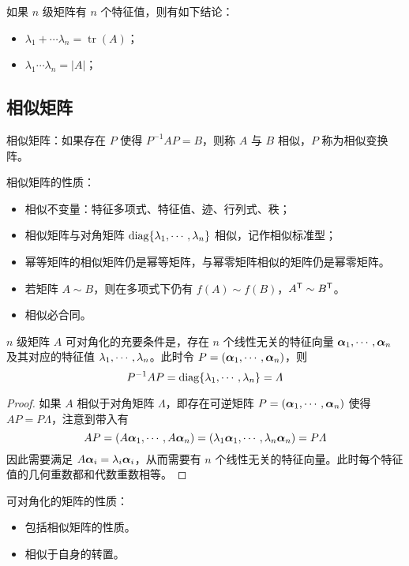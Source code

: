 如果 $n$ 级矩阵有 $n$ 个特征值，则有如下结论：
\begin{itemize}
	\item $\lambda_1 + \cdots \lambda_n = \operatorname{tr}(A)$；
	\item $\lambda_1 \cdots \lambda_n = |A|$；
\end{itemize}

\subsection{相似矩阵}

相似矩阵：如果存在 $P$ 使得 $P^{-1} A P = B$，则称 $A$ 与 $B$ 相似，$P$ 称为相似变换阵。

相似矩阵的性质：
\begin{itemize}
	\item 相似不变量：特征多项式、特征值、迹、行列式、秩；
	\item 相似矩阵与对角矩阵 $\operatorname{diag}\{\lambda_1,\cdots,\lambda_n\}$ 相似，记作相似标准型；
	\item 幂等矩阵的相似矩阵仍是幂等矩阵，与幂零矩阵相似的矩阵仍是幂零矩阵。
	\item 若矩阵 $A \sim B$，则在多项式下仍有 $f(A) \sim f(B)$，${A}^\mathsf{T} \sim {B}^\mathsf{T}$。
	\item 相似必合同。
\end{itemize}

\begin{theorem}[可对角化的充要条件]
	$n$ 级矩阵 $A$ 可对角化的充要条件是，存在 $n$ 个线性无关的特征向量 $\boldsymbol{\alpha}_1,\cdots,\boldsymbol{\alpha}_n$ 及其对应的特征值 $\lambda_1,\cdots,\lambda_n$。此时令 $P = (\boldsymbol{\alpha}_1,\cdots,\boldsymbol{\alpha}_n)$，则
	\[ P^{-1}AP = \operatorname{diag} \{\lambda_1,\cdots,\lambda_n\} = \varLambda \]
\end{theorem}

\begin{proof}
	如果 $A$ 相似于对角矩阵 $\varLambda$，即存在可逆矩阵 $P = (\boldsymbol{\alpha}_1,\cdots,\boldsymbol{\alpha}_n)$ 使得 $AP = P\varLambda$，注意到带入有
	\[ AP = (A\boldsymbol{\alpha}_1,\cdots,A\boldsymbol{\alpha}_n) = (\lambda_1 \boldsymbol{\alpha}_1, \cdots, \lambda_n \boldsymbol{\alpha}_n) = P\varLambda \]
	因此需要满足 $A \boldsymbol{\alpha}_i = \lambda_i \boldsymbol{\alpha}_i$，从而需要有 $n$ 个线性无关的特征向量。此时每个特征值的几何重数都和代数重数相等。
\end{proof}

可对角化的矩阵的性质：
\begin{itemize}
	\item 包括相似矩阵的性质。
	\item 相似于自身的转置。
\end{itemize}

